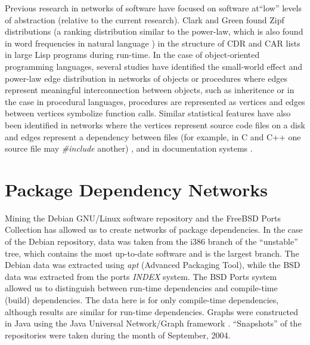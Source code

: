 \documentclass{elsart}
\begin{document}
\par Previous research in networks of software have focused on software at``low'' levels of abstraction (relative 
to the 
current research). Clark and Green \cite{CG77} found Zipf distributions (a ranking distribution similar to the 
power-law, which is also found in word frequencies in natural language \cite{Zipf}) in the structure of CDR and CAR 
lists in large Lisp programs during run-time. In the case of object-oriented programming languages, several studies 
\cite{CMy03,PNF04,VS04,WC03} have 
identified the small-world effect and power-law edge distribution in networks of objects or procedures where edges 
represent
meaningful interconnection between objects, such as inheritence or in the case in procedural languages, 
procedures are represented as vertices and edges between vertices symbolize function calls. Similar statistical features 
have also been identified in networks where the vertices represent source code files on a disk and edges represent a 
dependency between files (for example, in C and C++ one source file may {\em \#include} another) \cite{MLM03}, and in 
documentation systems \cite{WC03}.
\section{Package Dependency Networks} 
\par Mining the Debian GNU/Linux software repository \cite{Deb} and the FreeBSD Ports Collection \cite{BSD} has 
allowed us to create networks of package dependencies. In the case of the Debian repository, data was taken from the i386 
branch of the ``unstable'' tree, which contains the most up-to-date software and is the largest branch. The Debian 
data was extracted using {\em apt} (Advanced Packaging Tool), while the BSD data was extracted from the ports {\em 
INDEX} system. The BSD Ports system allowed us to distinguish between run-time dependencies and 
compile-time (build) dependencies. The data here is for only compile-time dependencies, although results are similar 
for run-time dependencies. Graphs were constructed in Java using the Java Universal Network/Graph framework 
\cite{JUNG}. ``Snapshots'' of the repositories were taken during the month of September, 2004.
\end{document}
